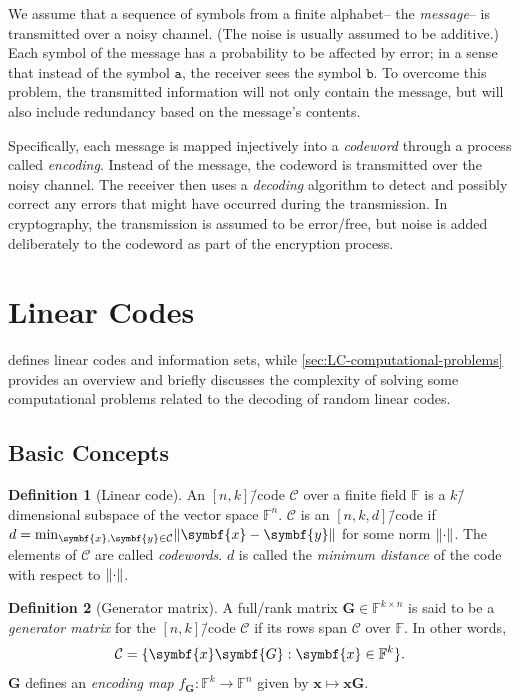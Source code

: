 \documentclass[version=last, paper=A4, parskip=half, oneside,%
toc=bibliography, toc=listof, listof=leveldown]{scrbook}
\theoremstyle{plain}
\theoremstyle{definition}
\newtheorem{definition}{Definition}
\theoremstyle{remark}
\renewcommand*{\vec}{\symbf}
\newcommand*{\mat}{\symbf}
\newcommand*{\FF}{\ensuremath{\mathbb{F}}}
\DeclarePairedDelimiter{\norm}{\lVert}{\rVert}
\begin{document}
We assume that a sequence of symbols from a finite alphabet\--- the
\emph{message}\--- is transmitted over a noisy channel.  (The noise is usually
assumed to be additive.)  Each symbol of the message has a probability to be
affected by error; in a sense that instead of the symbol \(\mathtt{a}\), the
receiver sees the symbol \(\mathtt{b}\).  To overcome this problem, the
transmitted information will not only contain the message, but will also include
redundancy based on the message's contents.

Specifically, each message is mapped injectively into a \emph{codeword} through
a process called \emph{encoding}.  Instead of the message, the codeword is
transmitted over the noisy channel.  The receiver then uses a \emph{decoding}
algorithm to detect and possibly correct any errors that might have occurred
during the transmission.  In cryptography, the transmission is assumed to be
error\-/free, but noise is added deliberately to the codeword as part of the
encryption process.

\section{Linear Codes}

 defines linear codes and information sets, while
\cref{sec:LC-computational-problems} provides an overview and briefly discusses
the complexity of solving some computational problems related to the decoding of
random linear codes.

\subsection{Basic Concepts}\label{sec:LC-basic-concepts}

\begin{definition}[Linear code]
  An \([n, k]\)\=/code \(\mathcal{C}\) over a finite field \(\FF\) is a
  \(k\)\=/dimensional subspace of the vector space \(\FF^n\).  \(\mathcal{C}\)
  is an \([n, k, d]\)\=/code if
  \(d = \min_{\vec{x}, \vec{y} \in \mathcal{C}} \norm{\vec{x} - \vec{y}}\) for
  some norm \(\norm{\cdot}\).  The elements of \(\mathcal{C}\) are called
  \emph{codewords}.  \(d\) is called the \emph{minimum distance} of the code
  with respect to \(\norm{\cdot}\).
\end{definition}

\begin{definition}[Generator matrix]
  A full\-/rank matrix \(\mat{G} \in \FF^{k \times n}\) is said to be a
  \emph{generator matrix} for the \([n, k]\)\=/code \(\mathcal{C}\) if its rows
  span \(\mathcal{C}\) over \(\FF\).  In other words,
  \[
    \mathcal{C} = \{\vec{x} \mat{G} : \vec{x} \in \FF^k\}\text.
  \]
  \(\mat{G}\) defines an \emph{encoding map}
  \(f_{\mat{G}}\colon \FF^k \to \FF^n\) given by
  \(\vec{x} \mapsto \vec{x} \vec{G}\).
\end{definition}
\end{document}

